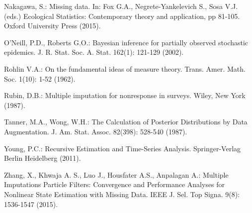 \begin{thebibliography}{}
Nakagawa, S.: Missing data. In: Fox G.A., Negrete-Yankelevich S., Sosa V.J. (eds.) Ecological Statistics: Contemporary theory and application, pp 81-105. Oxford University Press (2015). 

O'Neill, P.D., Roberts G.O.: Bayesian inference for partially observed stochastic epidemics. J. R. Stat. Soc. A. Stat. 162(1): 121-129 (2002).

Rohlin V.A.: On the fundamental ideas of measure theory.  Trans.
Amer. Math. Soc. 1(10): 1-52 (1962).

Rubin, D.B.: Multiple imputation for nonresponse in surveys. Wiley, New York (1987).

Tanner, M.A., Wong, W.H.: The Calculation of Posterior Distributions by Data Augmentation. J. Am. Stat. Assoc. 82(398): 528-540 (1987).

Young, P.C.: Recursive Estimation and Time-Series Analysis. Springer-Verlag Berlin Heidelberg (2011).

Zhang, X., Khwaja A. S., Luo J., Housfater A.S., Anpalagan A.: Multiple Imputations Particle Filters: Convergence and Performance Analyses for Nonlinear State Estimation with Missing Data. IEEE J. Sel. Top Signa. 9(8): 1536-1547 (2015).

\end{thebibliography}


\clearpage
\appendix






